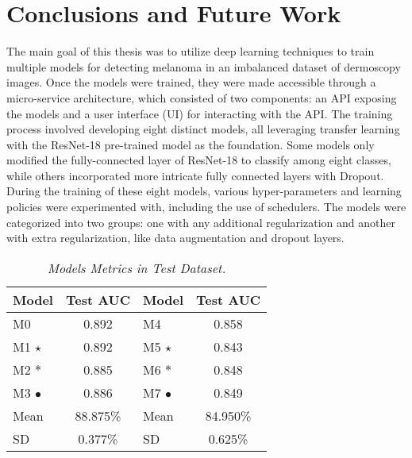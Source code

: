\chapter{Conclusions and Future Work}
\label{cap:concl}

The main goal of this thesis was to utilize deep learning techniques to train
multiple models for detecting melanoma in an imbalanced dataset of dermoscopy
images. Once the models were trained, they were made accessible through a
micro-service architecture, which consisted of two components: an API exposing
the models and a user interface (UI) for interacting with the API. The training
process involved developing eight distinct models, all leveraging transfer
learning with the ResNet-18 pre-trained model as the foundation. Some models
only modified the fully-connected layer of ResNet-18 to classify among eight
classes, while others incorporated more intricate fully connected layers with
Dropout. \\


During the training of these eight models, various hyper-parameters and learning
policies were experimented with, including the use of schedulers. The models
were categorized into two groups: one with any additional regularization and
another with extra regularization, like data augmentation and dropout layers.


\begin{table}[H]
\centering
\begin{tabular}{lc|lc}
    \toprule
  \textbf{Model} & \textbf{Test AUC} & \cellcolor{gray!50}\textbf{Model} & \cellcolor{gray!50}\textbf{Test AUC}  \\
\midrule
 M0 & 0.892 & \cellcolor{gray!50}M4 & \cellcolor{gray!50}0.858 \\
 M1 $\star$ & 0.892 & \cellcolor{gray!50}M5 $\star$ & \cellcolor{gray!50}0.843 \\
 M2 $\ast$ &  0.885 &  \cellcolor{gray!50}M6 $\ast$ & \cellcolor{gray!50}0.848 \\
 M3 $\bullet$ & 0.886 & \cellcolor{gray!50}M7 $\bullet$ & \cellcolor{gray!50}0.849 \\
 \midrule
Mean &  88.875\% & \cellcolor{gray!50}Mean & \cellcolor{gray!50}84.950\%  \\
SD &  0.377\%  &   \cellcolor{gray!50}SD &  \cellcolor{gray!50}0.625\%  \\

\bottomrule
\end{tabular}
\caption[Models Metrics in Test Dataset]
  {\textit{Models Metrics in Test Dataset.}}
{\label{table:test-set-resume-metrics}}
\end{table}

